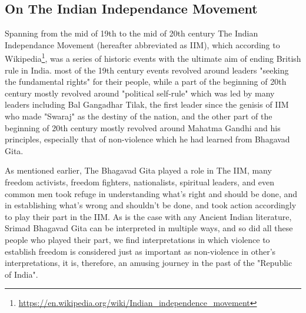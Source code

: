 \documentclass[a4paper]{article}
\begin{document}
\subsection{On The Indian Independance Movement}
Spanning from the mid of 19th to the mid of 20th century The Indian Independance Movement (hereafter abbreviated as IIM), which according to Wikipedia\footnote{\href{https://en.wikipedia.org/wiki/Indian\_independence\_movement}
{https://en.wikipedia.org/wiki/Indian\_independence\_movement}}, was a series of historic events with the ultimate aim of ending 
British rule in India. most of the 19th century events revolved around leaders "seeking the fundamental rights" for their people, 
while a part of the beginning of 20th century mostly revolved around "political self-rule" which was led by many leaders including Bal Gangadhar Tilak, 
the first leader since the genisis of IIM who made "Swaraj" as the destiny of the nation, and the other part of the beginning of 20th century mostly revolved around 
Mahatma Gandhi and his principles, especially that of non-violence which he had learned from Bhagavad Gita.

As mentioned earlier, The Bhagavad Gita played a role in The IIM, many  freedom activists, freedom fighters, nationalists, 
spiritual leaders, and even common men took refuge in understanding what's 
right and should be done, and in establishing what's wrong and shouldn't be done, and took action accordingly to play their part 
in the IIM. As is the case with any Ancient Indian literature, Srimad Bhagavad Gita can be interpreted in 
multiple ways, and so did all these people who played their part, we find interpretations in which violence to establish freedom 
is considered just as important as non-violence in other's interpretations, it is, therefore, an amusing 
journey in the past of the "Republic of India".
\end{document}
